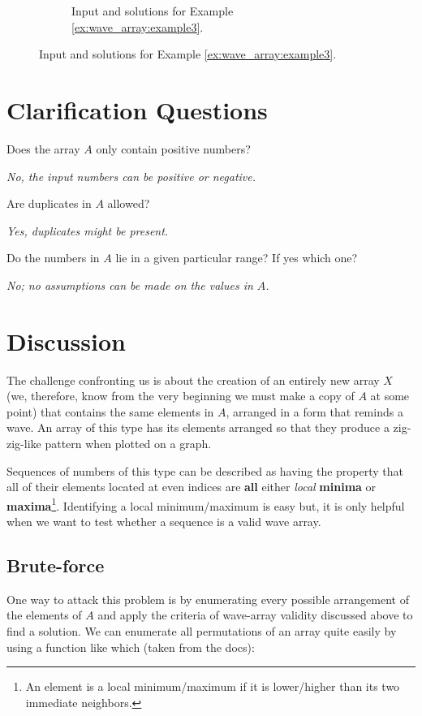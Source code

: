 \begin{figure}
\begin{subfigure}[t]{0.80\textwidth}
		 \caption{Input and solutions for Example \ref{ex:wave_array:example3}.}
		 \label{fig:wave_array:example13}
	  \end{subfigure}
\end{figure}


\section{Clarification Questions}

\begin{QandA}
	\item Does the array $A$ only contain positive numbers?
	\begin{answered}
		\textit{No, the input numbers can be positive or negative.}
	\end{answered}
	\item Are duplicates in $A$ allowed?
	\begin{answered}
		\textit{Yes, duplicates might be present.}
	\end{answered}
	\item Do the numbers in $A$ lie in a given particular range? If yes which one?
	\begin{answered}
		\textit{No; no assumptions can be made on the values in $A$.}
	\end{answered}
\end{QandA}

\section{Discussion}
\label{wave_array:sec:discussion}
The challenge confronting us is about the creation of an entirely new array $X$ (we, therefore, know from the very beginning we must make a copy of $A$ at some point) that contains the same elements in $A$, arranged in a form that reminds a wave. 
An array of this type has its elements arranged so that they produce a zig-zig-like pattern when plotted on a graph. 

Sequences of numbers of this type can be described as having the property that all of their elements located at even indices are \textbf{all} either 
\textit{local}  \textbf{minima} or  \textbf{maxima}\footnote{An element is a local minimum/maximum if it is lower/higher than its two immediate neighbors.}. 
Identifying a local minimum/maximum is easy but, it is only helpful when we want to test whether a sequence is a valid wave array.

\subsection{Brute-force}
\label{wave_array:sec:bruteforce}
One way to attack this problem is by enumerating every possible arrangement of the elements of $A$ and apply the criteria of wave-array validity discussed above to find a solution. 
We can enumerate all permutations of an array quite easily by using a function like  which (taken from the docs): \quoteblock{"Rearranges the elements in the range [first,last) into the next lexicographically greater permutation".}

